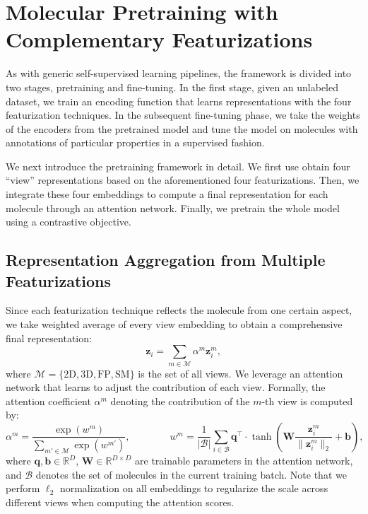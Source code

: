 \section{Molecular Pretraining with Complementary Featurizations} %


As with generic self-supervised learning pipelines, the \themodel framework is divided into two stages, pretraining and fine-tuning.
In the first stage, given an unlabeled dataset, we train an encoding function that learns representations with the four featurization techniques.
In the subsequent fine-tuning phase, we take the weights of the encoders from the pretrained model and tune the model on molecules with annotations of particular properties in a supervised fashion.

We next introduce the \themodel pretraining framework in detail.
We first use obtain four ``view'' representations based on the aforementioned four featurizations.
Then, we integrate these four embeddings to compute a final representation for each molecule through an attention network.
Finally, we pretrain the whole model using a contrastive objective.

\subsection{Representation Aggregation from Multiple Featurizations} %

Since each featurization technique reflects the molecule from one certain aspect, we take weighted average of every view embedding to obtain a comprehensive final representation:
\begin{equation}
	\bm{z}_i = \sum_{m \in \mathcal{M}}\alpha^m \bm{z}^m_i,
	\label{eq:attention-aggregation}
\end{equation}
where \(\mathcal{M} = \{\text{2D}, \text{3D}, \text{FP}, \text{SM}\}\) is the set of all views.
We leverage an attention network \cite{Bahdanau:2015vz} that learns to adjust the contribution of each view.
Formally, the attention coefficient \(\alpha^m\) denoting the contribution of the \(m\)-th view is computed by:
\begin{equation}
	\alpha^m = \frac{\exp(w^m)}{\sum_{m' \in \mathcal{M}} \exp(w^{m'})},\qquad\qquad w^m = \frac{1}{|\mathcal{B}|} \sum_{i \in \mathcal{B}} \bm{q}^\top \cdot \tanh\left( \bm{W}\frac{\bm{z}_i^m}{\|\bm{z}_i^m\|_2} + \bm{b}\right),
\end{equation}
where \(\bm{q}, \bm{b} \in \mathbb{R}^{D}\), \(\bm{W} \in \mathbb{R}^{D\times D}\) are trainable parameters in the attention network, and \(\mathcal{B}\) denotes the set of molecules in the current training batch.
Note that we perform \(\ell_2\) normalization on all embeddings to regularize the scale across different views when computing the attention scores.


